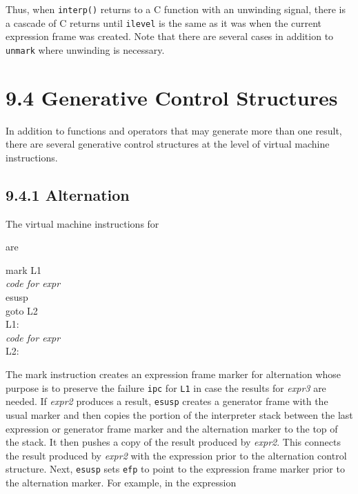 Thus, when \texttt{interp()} returns to a C function with an unwinding
signal, there is a cascade of C returns until \texttt{ilevel} is the
same as it was when the current expression frame was created. Note
that there are several cases in addition to \texttt{unmark} where
unwinding is necessary.

\section[9.4 Generative Control Structures]{9.4 Generative Control Structures}

In addition to functions and operators that may generate more than one
result, there are several generative control structures at the level
of virtual machine instructions.

\subsection[9.4.1 Alternation]{9.4.1 Alternation}

The virtual machine instructions for


are
\begin{iconcode}
\>mark\>\>\> L1\\
\>\textit{code for expr}\\
\>esusp\\
\>goto\>\>\> L2\\
L1:\\
\>\textit{code for expr}\textit{}\\
L2:
\end{iconcode}

The mark instruction creates an expression frame marker for
alternation whose purpose is to preserve the failure \texttt{ipc} for
\texttt{L1} in case the results for \textit{expr3 }are needed. If
\textit{expr2 }produces a result, \texttt{esusp} creates a generator
frame with the usual marker and then copies the portion of the
interpreter stack between the last expression or generator frame
marker and the alternation marker to the top of the stack. It then
pushes a copy of the result produced by \textit{expr2}. This connects
the result produced by \textit{expr2 }with the expression prior to the
alternation control structure. Next, \texttt{esusp} sets \texttt{efp}
to point to the expression frame marker prior to the alternation
marker. For example, in the expression

